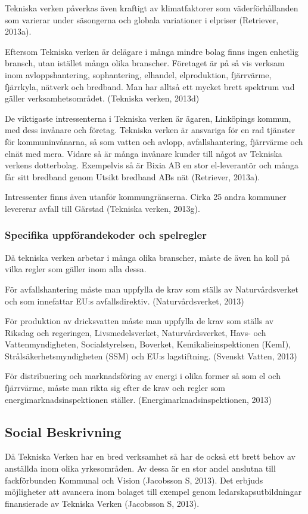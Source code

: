\documentclass[10pt,a4paper]{article}
\begin{document}
Tekniska verken påverkas även kraftigt av klimatfaktorer som väderförhållanden 
som varierar under säsongerna och globala variationer i elpriser (Retriever, 2013a).

Eftersom Tekniska verken är delägare i många mindre bolag finns ingen enhetlig 
bransch, utan istället många olika branscher. Företaget är på så vis verksam inom
avloppshantering, sophantering, elhandel, elproduktion, fjärrvärme, fjärrkyla, 
nätverk och bredband. Man har alltså ett mycket brett spektrum vad gäller 
verksamhetsområdet. (Tekniska verken, 2013d)

De viktigaste intressenterna i Tekniska verken är ägaren, Linköpings kommun,
med dess invånare och företag. Tekniska verken är ansvariga för en rad tjänster
för kommuninvånarna, så som vatten och avlopp, avfallshantering, fjärrvärme och
elnät med mera. Vidare så är många invånare kunder till något av Tekniska
verkens dotterbolag. Exempelvis så är Bixia AB en stor el-leverantör och många
får sitt bredband genom Utsikt bredband ABs nät (Retriever, 2013a). 

Intressenter finns även utanför kommungränserna. Cirka 25 andra kommuner
levererar avfall till Gärstad (Tekniska verken, 2013g).

\subsubsection{Specifika uppförandekoder och spelregler} 
Då tekniska verken arbetar i många olika branscher, måste de även ha koll på
vilka regler som gäller inom alla dessa.

För avfallshantering måste man uppfylla de krav som ställs av Naturvårdsverket och
som innefattar EU:s avfallsdirektiv. (Naturvårdsverket, 2013)

För produktion av dricksvatten måste man uppfylla de krav som ställs av Riksdag
och regeringen, Livsmedelsverket, Naturvårdsverket, Havs- och Vattenmyndigheten,
Socialstyrelsen, Boverket, Kemikalieinspektionen (KemI), Strålsäkerhetsmyndigheten 
(SSM) och EU:s lagstiftning. (Svenskt Vatten, 2013)

För distribuering och marknadsföring av energi i olika former så som el och
fjärrvärme, måste man rikta sig efter de krav och regler som
energimarknadsinspektionen ställer. (Energimarknadsinspektionen, 2013)

\subsection{Social Beskrivning}
Då Tekniska Verken har en bred verksamhet så har de också ett brett
behov av anställda inom olika yrkesområden. Av dessa är en stor andel
anslutna till fackförbunden Kommunal och Vision (Jacobsson S,
2013). Det erbjuds möjligheter att avancera inom bolaget till exempel
genom ledarskapsutbildningar finansierade av Tekniska Verken
(Jacobsson S, 2013). 
\end{document}
